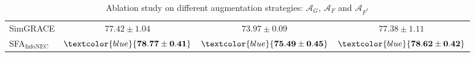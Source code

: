\begin{table}[t]
\begin{minipage}[C]{0.38\textwidth}
{\begin{tabular}{lccc}
         SimGRACE                  &$77.42 \pm 1.04$   &$73.97 \pm 0.09$  &$77.38 \pm 1.11$ \\
         \rowcolor{LightCyan} SFA$_{\text{InfoNEC}} $     &$\textcolor{blue}{\mathbf{78.77 \pm 0.41}}$   &$\textcolor{blue}{\mathbf{75.49 \pm 0.45}}$  &$\textcolor{blue}{\mathbf{78.62 \pm 0.42}}$ \\
    \bottomrule%
    \end{tabular}
    }
    \caption{Graph classification. }
    \label{tab:graphcls}
\end{minipage}
\hspace{0.2cm}
\begin{minipage}[C]{0.31\textwidth}
\caption{\label{tab:AblationStudy}Ablation study on different augmentation strategies: $\mathcal{A}_G$, $\mathcal{A}_F$ and $\mathcal{A}_{F^*}$}
\end{minipage}
\vskip -0.25in
\end{table}





